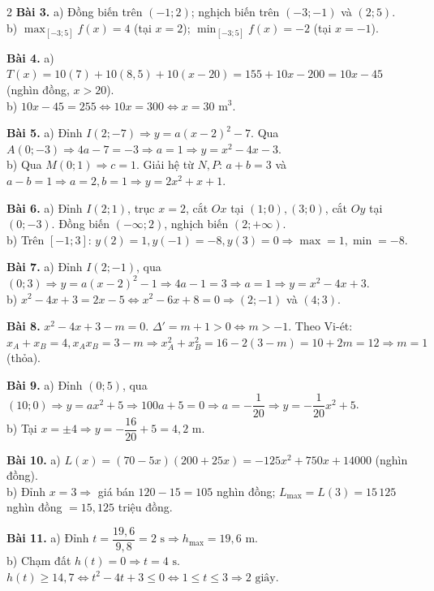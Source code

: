 \documentclass[12pt,a4paper]{article}
\begin{document}
\begin{multicols}{2}
\textbf{Bài 3.} a) Đồng biến trên $(-1; 2)$; nghịch biến trên $(-3; -1)$ và $(2; 5)$.\\
b) $\max_{[-3; 5]} f(x) = 4$ (tại $x=2$); $\min_{[-3; 5]} f(x) = -2$ (tại $x=-1$).

\textbf{Bài 4.} a) $T(x) = 10(7) + 10(8{,}5) + 10(x - 20) = 155 + 10x - 200 = 10x - 45$ (nghìn đồng, $x > 20$).\\
b) $10x - 45 = 255 \Leftrightarrow 10x = 300 \Leftrightarrow x = 30\text{ m}^3$.

\textbf{Bài 5.} a) Đỉnh $I(2; -7) \Rightarrow y = a(x - 2)^2 - 7$. Qua $A(0; -3) \Rightarrow 4a - 7 = -3 \Rightarrow a = 1 \Rightarrow y = x^2 - 4x - 3$.\\
b) Qua $M(0; 1) \Rightarrow c = 1$. Giải hệ từ $N, P$: $a + b = 3$ và $a - b = 1 \Rightarrow a = 2, b = 1 \Rightarrow y = 2x^2 + x + 1$.

\textbf{Bài 6.} a) Đỉnh $I(2; 1)$, trục $x = 2$, cắt $Ox$ tại $(1; 0), (3; 0)$, cắt $Oy$ tại $(0; -3)$. Đồng biến $(-\infty; 2)$, nghịch biến $(2; +\infty)$.\\
b) Trên $[-1; 3]$: $y(2) = 1, y(-1) = -8, y(3) = 0 \Rightarrow \max = 1, \min = -8$.

\textbf{Bài 7.} a) Đỉnh $I(2; -1)$, qua $(0; 3) \Rightarrow y = a(x-2)^2 - 1 \Rightarrow 4a - 1 = 3 \Rightarrow a = 1 \Rightarrow y = x^2 - 4x + 3$.\\
b) $x^2 - 4x + 3 = 2x - 5 \Leftrightarrow x^2 - 6x + 8 = 0 \Rightarrow (2; -1)$ và $(4; 3)$.

\textbf{Bài 8.} $x^2 - 4x + 3 - m = 0$. $\Delta' = m + 1 > 0 \Leftrightarrow m > -1$. Theo Vi-ét: $x_A + x_B = 4, x_A x_B = 3 - m \Rightarrow x_A^2 + x_B^2 = 16 - 2(3 - m) = 10 + 2m = 12 \Rightarrow m = 1$ (thỏa).

\textbf{Bài 9.} a) Đỉnh $(0; 5)$, qua $(10; 0) \Rightarrow y = a x^2 + 5 \Rightarrow 100a + 5 = 0 \Rightarrow a = -\dfrac{1}{20} \Rightarrow y = -\dfrac{1}{20}x^2 + 5$.\\
b) Tại $x = \pm 4 \Rightarrow y = -\dfrac{16}{20} + 5 = 4{,}2\text{ m}$.

\textbf{Bài 10.} a) $L(x) = (70 - 5x)(200 + 25x) = -125x^2 + 750x + 14000$ (nghìn đồng).\\
b) Đỉnh $x = 3 \Rightarrow$ giá bán $120 - 15 = 105$ nghìn đồng; $L_{\max} = L(3) = 15\,125$ nghìn đồng $= 15{,}125$ triệu đồng.

\textbf{Bài 11.} a) Đỉnh $t = \dfrac{19{,}6}{9{,}8} = 2\text{ s} \Rightarrow h_{\max} = 19{,}6\text{ m}$.\\
b) Chạm đất $h(t) = 0 \Rightarrow t = 4\text{ s}$. $h(t) \ge 14{,}7 \Leftrightarrow t^2 - 4t + 3 \le 0 \Leftrightarrow 1 \le t \le 3 \Rightarrow 2\text{ giây}$.


\end{multicols}
\end{document}

